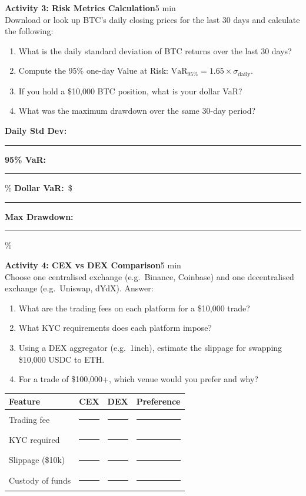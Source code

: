 \documentclass[11pt,a4paper]{article}
\newcommand{\activitybox}[3]{%
  \noindent\colorbox{mllavender4}{\parbox{\dimexpr\linewidth-2\fboxsep}{%
    \textbf{\color{mlpurple}#1}\hfill\textcolor{mlgray}{\small #2}\\[2pt]#3%
  }}\par\vspace{4pt}%
}
\newcommand{\fillcell}{\rule{2.2cm}{0.3pt}}
\begin{document}
\vspace{2pt}

\activitybox{Activity 3: Risk Metrics Calculation}{5 min}{%
Download or look up BTC's daily closing prices for the last 30 days and calculate the following:
\begin{enumerate}
\item What is the daily standard deviation of BTC returns over the last 30 days?
\item Compute the 95\% one-day Value at Risk: $\text{VaR}_{95\%} = 1.65 \times \sigma_{\text{daily}}$.
\item If you hold a \$10{,}000 BTC position, what is your dollar VaR?
\item What was the maximum drawdown over the same 30-day period?
\end{enumerate}
\vspace{4pt}
\noindent
\textbf{Daily Std Dev:}~\fillcell\quad
\textbf{95\% VaR:}~\fillcell\%\quad
\textbf{Dollar VaR:}~\$\fillcell\quad
\textbf{Max Drawdown:}~\fillcell\%
\vspace{2pt}
}

\vspace{2pt}

\activitybox{Activity 4: CEX vs DEX Comparison}{5 min}{%
Choose one centralised exchange (e.g.\ Binance, Coinbase) and one decentralised exchange (e.g.\ Uniswap, dYdX). Answer:
\begin{enumerate}
\item What are the trading fees on each platform for a \$10{,}000 trade?
\item What KYC requirements does each platform impose?
\item Using a DEX aggregator (e.g.\ 1inch), estimate the slippage for swapping \$10{,}000 USDC to ETH.
\item For a trade of \$100{,}000+, which venue would you prefer and why?
\end{enumerate}
\vspace{4pt}
{\footnotesize\renewcommand{\arraystretch}{1.35}%
\setlength{\tabcolsep}{5pt}%
\begin{tabular}{@{}llll@{}}
\toprule
\textbf{Feature} & \textbf{CEX} & \textbf{DEX} & \textbf{Preference} \\
\midrule
Trading fee         & \fillcell & \fillcell & \fillcell \\
KYC required        & \fillcell & \fillcell & \fillcell \\
Slippage (\$10k)    & \fillcell & \fillcell & \fillcell \\
Custody of funds    & \fillcell & \fillcell & \fillcell \\
\bottomrule
\end{tabular}}
\vspace{2pt}
}
\end{document}
